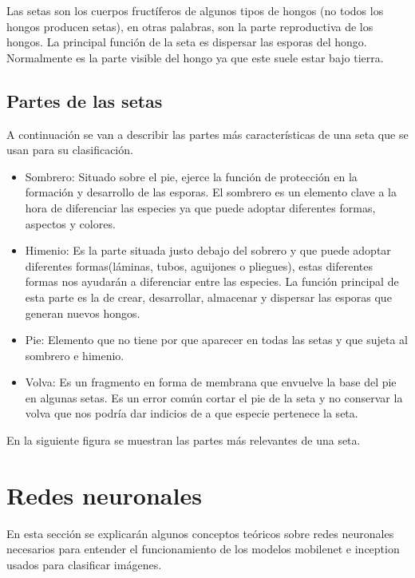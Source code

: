 Las setas son los cuerpos fructíferos de algunos tipos de hongos (no todos los hongos producen setas), en otras palabras, son la parte reproductiva de los hongos. La principal función de la seta es dispersar las esporas del hongo. Normalmente es la parte visible del hongo ya que este suele estar bajo tierra.

\subsection{Partes de las setas}

A continuación se van a describir las partes más características de una seta que se usan para su clasificación.

\begin{itemize}
	\item{Sombrero}: Situado sobre el pie, ejerce la función de protección en la formación y desarrollo de las esporas. El sombrero es un elemento clave a la hora de diferenciar las especies ya que puede adoptar diferentes formas, aspectos y colores.
	\item{Himenio}: Es la parte situada justo debajo del sobrero y que puede adoptar diferentes formas(láminas, tubos, aguijones o pliegues), estas diferentes formas nos ayudarán a diferenciar entre las especies. La función principal de esta parte es la de crear, desarrollar, almacenar y dispersar las esporas que generan nuevos hongos.
	\item{Pie}: Elemento que no tiene por que aparecer en todas las setas y que sujeta al sombrero e himenio.
	\item{Volva}: Es un fragmento en forma de membrana que envuelve la base del pie en algunas setas. Es un error común cortar el pie de la seta y no conservar la volva que nos podría dar indicios de a que especie pertenece la seta.\cite{partesSeta}
\end{itemize}

En la siguiente figura se muestran las partes más relevantes de una seta.

\section{Redes neuronales}

En esta sección se explicarán algunos conceptos teóricos sobre redes neuronales necesarios para entender el funcionamiento de los modelos mobilenet e inception usados para clasificar imágenes.

